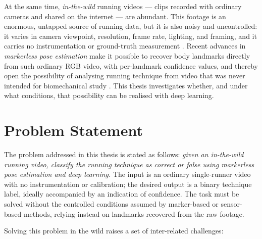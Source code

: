 At the same time, \emph{in-the-wild} running videos --- clips recorded with
ordinary cameras and shared on the internet --- are abundant. This footage is an
enormous, untapped source of running data, but it is also noisy and
uncontrolled: it varies in camera viewpoint, resolution, frame rate, lighting,
and framing, and it carries no instrumentation or ground-truth measurement
\cite{topham2023hpesurvey}. Recent advances in \emph{markerless pose estimation}
make it possible to recover body landmarks directly from such ordinary RGB
video, with per-landmark confidence values, and thereby open the possibility of
analysing running technique from video that was never intended for biomechanical
study \cite{topham2023hpesurvey, lugaresi2019mediapipe, bazarevsky2020blazepose}. This thesis
investigates whether, and under what conditions, that possibility can be realised
with deep learning.

\section{Problem Statement}
\label{sec:intro-problem}

The problem addressed in this thesis is stated as follows: \emph{given an
in-the-wild running video, classify the running technique as correct or false
using markerless pose estimation and deep learning.} The input is an ordinary
single-runner video with no instrumentation or calibration; the desired output
is a binary technique label, ideally accompanied by an indication of confidence.
The task must be solved without the controlled conditions assumed by
marker-based or sensor-based methods, relying instead on landmarks recovered
from the raw footage.

Solving this problem in the wild raises a set of inter-related challenges:

